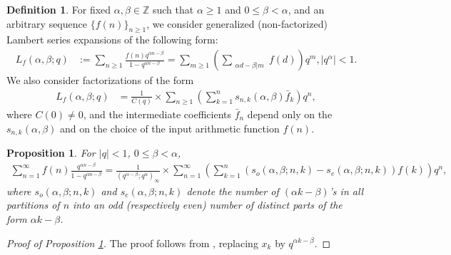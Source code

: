 \documentclass[12pt,reqno,a4letter]{article}
\numberwithin{figure}{section}
\numberwithin{table}{section}
\numberwithin{equation}{section}
\theoremstyle{plain}
\newtheorem{prop}[theorem]{Proposition}
\numberwithin{theorem}{section}
\theoremstyle{definition}
\newtheorem{definition}[theorem]{Definition}
\begin{document}
\begin{definition}
\label{def_LfAlphaBetaq_LfAlphaBetaqFBarExp_GenLGFExps_v1}
For fixed $\alpha, \beta \in \mathbb{Z}$ such that $\alpha \geq 1$ and $0 \leq \beta < \alpha$, and an 
arbitrary sequence $\{f(n)\}_{n \geq 1}$, 
we consider generalized (non-factorized) Lambert series expansions of the following form: 
\begin{align}
\label{eqn_GenLambertSeries_LaAlphaBetaq_def}
L_f(\alpha, \beta; q) & := \sum_{n \geq 1} \frac{f(n) q^{\alpha n-\beta}}{1-q^{\alpha n-\beta}} = 
     \sum_{m \geq 1} \left(\sum_{\substack{\alpha d-\beta | m}} f(d)
     \right) q^m, 
     |q^{\alpha}| < 1. 
\end{align} 
We also consider factorizations of the form 
\begin{align} 
\label{eqn_GenFactThmExp_def_v1} 
L_f(\alpha, \beta; q) & = \frac{1}{C(q)} \times \sum_{n \geq 1} \left(
     \sum_{k=1}^n s_{n,k}(\alpha, \beta) \bar{f}_k \right) q^n, 
\end{align} 
where $C(0) \neq 0$, and the intermediate coefficients 
$\bar{f}_n$ depend only on the $s_{n,k}(\alpha, \beta)$ and on the 
choice of the input arithmetic function $f(n)$. 
\end{definition}

\begin{prop}
\label{prop_GenLGF_p1} 
For $|q|<1$, $0 \leq \beta<\alpha$,
\begin{align*}
\sum_{n=1}^{\infty} f(n) \frac{q^{\alpha n-\beta}}{1-q^{\alpha n-\beta}} = 
     \frac{1}{(q^{\alpha-\beta};q^\alpha)_\infty} \times \sum_{n=1}^{\infty} \left( 
     \sum_{k=1}^n (s_o(\alpha, \beta; n,k)-s_e(\alpha, \beta; n,k)) f(k)\right)  q^n,
\end{align*}
where $s_o(\alpha, \beta; n,k)$ and $s_e(\alpha, \beta; n,k)$ 
denote the number of $(\alpha k-\beta)$'s in all partitions of $n$ into an odd 
(respectively even) number of distinct parts of the form $\alpha k-\beta$.
\end{prop}
\begin{proof}[Proof of Proposition \ref{prop_GenLGF_p1}]
The proof follows from \cite[eq. 2.1]{MERCA-LSFACTTHM}, replacing $x_k$ by $q^{\alpha k-\beta}$.
\end{proof}
\end{document}
